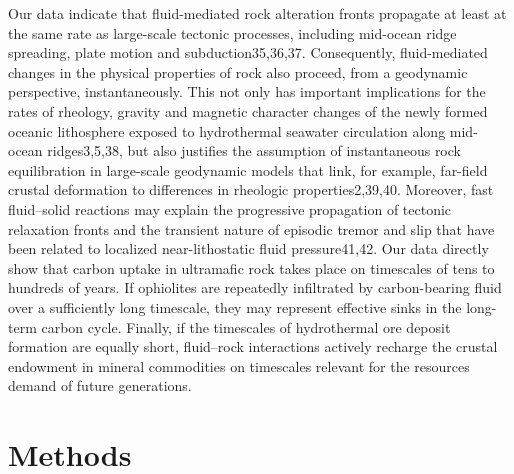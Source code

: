 Our data indicate that fluid-mediated rock alteration fronts propagate at least at the same rate as large-scale tectonic processes, including mid-ocean ridge spreading, plate motion and subduction35,36,37. Consequently, fluid-mediated changes in the physical properties of rock also proceed, from a geodynamic perspective, instantaneously. This not only has important implications for the rates of rheology, gravity and magnetic character changes of the newly formed oceanic lithosphere exposed to hydrothermal seawater circulation along mid-ocean ridges3,5,38, but also justifies the assumption of instantaneous rock equilibration in large-scale geodynamic models that link, for example, far-field crustal deformation to differences in rheologic properties2,39,40. Moreover, fast fluid–solid reactions may explain the progressive propagation of tectonic relaxation fronts and the transient nature of episodic tremor and slip that have been related to localized near-lithostatic fluid pressure41,42. Our data directly show that carbon uptake in ultramafic rock takes place on timescales of tens to hundreds of years. If ophiolites are repeatedly infiltrated by carbon-bearing fluid over a sufficiently long timescale, they may represent effective sinks in the long-term carbon cycle. Finally, if the timescales of hydrothermal ore deposit formation are equally short, fluid–rock interactions actively recharge the crustal endowment in mineral commodities on timescales relevant for the resources demand of future generations.

\section*{Methods}


